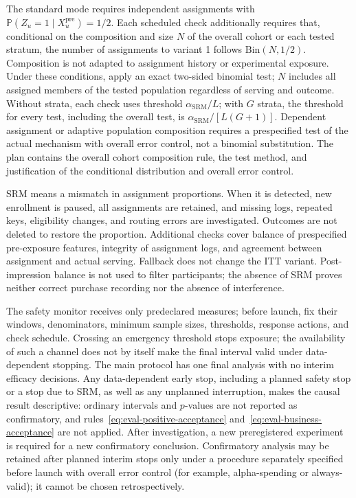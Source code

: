 \documentclass[12pt,a4paper]{article}
\newcommand{\Prob}{\mathbb P}
\theoremstyle{plainru}
\begin{document}
The standard mode requires independent assignments with
$\Prob(Z_u=1\mid X_u^{\mathrm{pre}})=1/2$. Each scheduled check
additionally requires that, conditional on the composition and size $N$ of the overall cohort
or each tested stratum, the number of assignments to variant 1 follows
$\mathrm{Bin}(N,1/2)$. Composition is not adapted to assignment history
or experimental exposure. Under these conditions, apply an exact
two-sided binomial test; $N$ includes all assigned members
of the tested population regardless of serving and outcome.
Without strata, each check uses threshold $\alpha_{\mathrm{SRM}}/L$;
with $G$ strata, the threshold for every test, including the overall test, is
$\alpha_{\mathrm{SRM}}/[L(G+1)]$. Dependent assignment or adaptive
population composition requires a prespecified test of the actual
mechanism with overall error control, not a binomial substitution.
The plan contains the overall cohort composition rule, the test method,
and justification of the conditional distribution and overall error control.

SRM means a mismatch in assignment proportions. When it is detected,
new enrollment is paused, all assignments are retained, and missing
logs, repeated keys, eligibility changes, and routing errors are investigated.
Outcomes are not deleted to restore the proportion. Additional checks cover
balance of prespecified pre-exposure features, integrity of assignment
logs, and agreement between assignment and actual serving.
Fallback does not change the ITT variant. Post-impression balance is not used
to filter participants; the absence of SRM proves neither correct
purchase recording nor the absence of interference.

The safety monitor receives only predeclared measures;
before launch, fix their windows, denominators, minimum sample sizes, thresholds,
response actions, and check schedule. Crossing an emergency
threshold stops exposure; the availability of such a channel does not by itself
make the final interval valid under data-dependent stopping.
The main protocol has one final analysis with no interim
efficacy decisions. Any data-dependent early
stop, including a planned safety stop or a stop
due to SRM, as well as any unplanned interruption, makes the causal result
descriptive: ordinary intervals and $p$-values are not reported as
confirmatory, and rules~\eqref{eq:eval-positive-acceptance}
and~\eqref{eq:eval-business-acceptance} are not applied. After investigation, a new
preregistered experiment is required for a new confirmatory conclusion.
Confirmatory analysis may be retained after planned interim
stops only under a procedure separately specified before launch
with overall error control (for example, alpha-spending or always-valid);
it cannot be chosen retrospectively.
\end{document}
